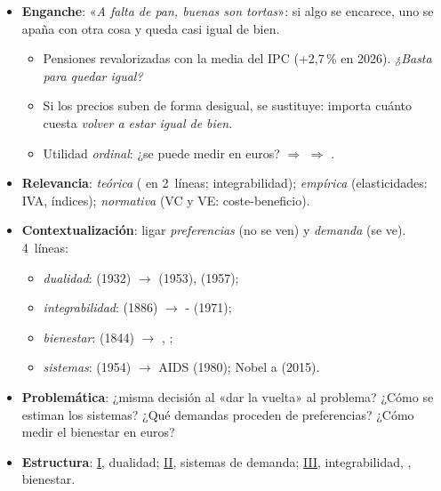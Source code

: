 \documentclass{article}
\begin{document}
\cabecerarepaso
\begin{columnas}

\begin{itemize}
\item \textbf{Enganche}: «\emph{A falta de pan, buenas son tortas}»: si algo se encarece, uno se apaña con otra cosa y queda casi igual de bien.
  \begin{itemize}
  \item Pensiones revalorizadas con la media del IPC (+2,7\,\% en 2026). \emph{¿Basta para quedar igual?}
  \item Si los precios suben de forma desigual, se sustituye: importa cuánto cuesta \emph{volver a estar igual de bien}.
  \item Utilidad \emph{ordinal}: ¿se puede medir en euros? $\Rightarrow$  $\Rightarrow$ .
  \end{itemize}
\item \textbf{Relevancia}: \emph{teórica} ( en 2~líneas; integrabilidad); \emph{empírica} (elasticidades: IVA, índices); \emph{normativa} (VC y VE: coste-beneficio).
\item \textbf{Contextualización}: ligar \emph{preferencias} (no se ven) y \emph{demanda} (se ve). 4~líneas:
  \begin{itemize}
  \item \emph{dualidad}:  (1932) $\to$  (1953),  (1957);
  \item \emph{integrabilidad}:  (1886) $\to$ - (1971);
  \item \emph{bienestar}:  (1844) $\to$ , ;
  \item \emph{sistemas}:  (1954) $\to$ AIDS (1980); Nobel a  (2015).
  \end{itemize}
\item \textbf{Problemática}: ¿misma decisión al «dar la vuelta» al problema? ¿Cómo se estiman los sistemas? ¿Qué demandas proceden de preferencias? ¿Cómo medir el bienestar en euros?
\item \textbf{Estructura}: \hyperref[rep:I]{I}, dualidad; \hyperref[rep:II]{II}, sistemas de demanda; \hyperref[rep:III]{III}, integrabilidad, , bienestar.
\end{itemize}


\end{columnas}
\end{document}
